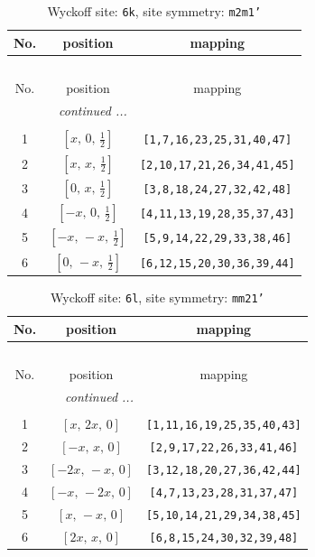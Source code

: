 \documentclass[fleqn,8pt]{jsarticle}
\begin{document}
\renewcommand{\arraystretch}{1.2}
\begin{longtable}{ccc}
\caption{Wyckoff site: {\tt 6k}, site symmetry: {\tt m2m1'}}
 \\
 \hline \hline
No. & position & mapping \\ \hline \endfirsthead

\multicolumn{2}{l}{\tablename\ \thetable{}} \\
 \hline \hline
No. & position & mapping \\ \hline \endhead

 \hline \hline
\multicolumn{2}{r}{\footnotesize\it continued ...} \\ \endfoot

 \hline \hline
\multicolumn{2}{r}{} \\ \endlastfoot

1 & $\left[ x,\, 0,\, \frac{1}{2} \right]$ & {\tt [1,7,16,23,25,31,40,47]} \\ \hline
2 & $\left[ x,\, x,\, \frac{1}{2} \right]$ & {\tt [2,10,17,21,26,34,41,45]} \\ \hline
3 & $\left[ 0,\, x,\, \frac{1}{2} \right]$ & {\tt [3,8,18,24,27,32,42,48]} \\ \hline
4 & $\left[ - x,\, 0,\, \frac{1}{2} \right]$ & {\tt [4,11,13,19,28,35,37,43]} \\ \hline
5 & $\left[ - x,\, - x,\, \frac{1}{2} \right]$ & {\tt [5,9,14,22,29,33,38,46]} \\ \hline
6 & $\left[ 0,\, - x,\, \frac{1}{2} \right]$ & {\tt [6,12,15,20,30,36,39,44]} \\
\end{longtable}
\renewcommand{\arraystretch}{1.2}
\begin{longtable}{ccc}
\caption{Wyckoff site: {\tt 6l}, site symmetry: {\tt mm21'}}
 \\
 \hline \hline
No. & position & mapping \\ \hline \endfirsthead

\multicolumn{2}{l}{\tablename\ \thetable{}} \\
 \hline \hline
No. & position & mapping \\ \hline \endhead

 \hline \hline
\multicolumn{2}{r}{\footnotesize\it continued ...} \\ \endfoot

 \hline \hline
\multicolumn{2}{r}{} \\ \endlastfoot

1 & $\left[ x,\, 2 x,\, 0 \right]$ & {\tt [1,11,16,19,25,35,40,43]} \\ \hline
2 & $\left[ - x,\, x,\, 0 \right]$ & {\tt [2,9,17,22,26,33,41,46]} \\ \hline
3 & $\left[ - 2 x,\, - x,\, 0 \right]$ & {\tt [3,12,18,20,27,36,42,44]} \\ \hline
4 & $\left[ - x,\, - 2 x,\, 0 \right]$ & {\tt [4,7,13,23,28,31,37,47]} \\ \hline
5 & $\left[ x,\, - x,\, 0 \right]$ & {\tt [5,10,14,21,29,34,38,45]} \\ \hline
6 & $\left[ 2 x,\, x,\, 0 \right]$ & {\tt [6,8,15,24,30,32,39,48]} \\
\end{longtable}
\end{document}

